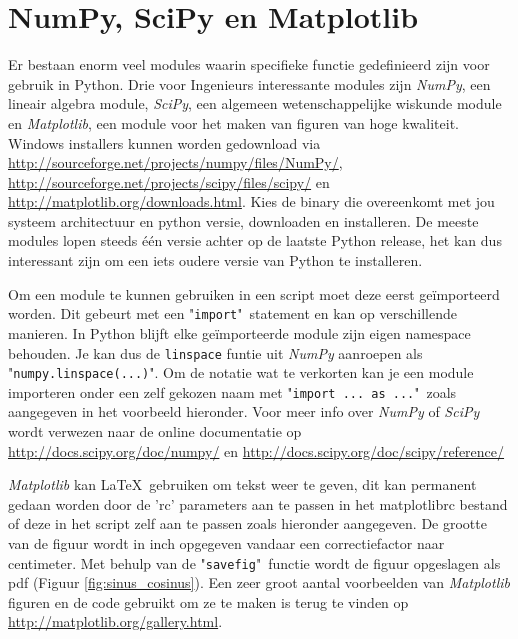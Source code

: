 \documentclass[11pt,twoside]{article}
\begin{document}
	\section{NumPy, SciPy en Matplotlib} 
Er bestaan enorm veel modules waarin specifieke functie gedefinieerd zijn voor gebruik in Python. Drie voor Ingenieurs interessante modules zijn \emph{NumPy}, een lineair algebra module, \emph{SciPy}, een algemeen wetenschappelijke wiskunde module en \emph{Matplotlib}, een module voor het maken van figuren van hoge kwaliteit. Windows installers kunnen worden gedownload via \url{http://sourceforge.net/projects/numpy/files/NumPy/}, \url{http://sourceforge.net/projects/scipy/files/scipy/} en \url{http://matplotlib.org/downloads.html}. Kies de binary die overeenkomt met jou systeem architectuur en python versie, downloaden en installeren. De meeste modules lopen steeds één versie achter op de laatste Python release, het kan dus interessant zijn om een iets oudere versie van Python te installeren.

Om een module te kunnen gebruiken in een script moet deze eerst geïmporteerd worden. Dit gebeurt met een "\lstinline{import}"\ statement en kan op verschillende manieren. In Python blijft elke geïmporteerde module zijn eigen namespace behouden. Je kan dus de \lstinline{linspace} funtie uit \emph{NumPy} aanroepen als "\lstinline{numpy.linspace(...)}". Om de notatie wat te verkorten kan je een module importeren onder een zelf gekozen naam met "\lstinline{import ... as ...}"\ zoals aangegeven in het voorbeeld hieronder. Voor meer info over \emph{NumPy} of \emph{SciPy} wordt verwezen naar de online documentatie op \url{http://docs.scipy.org/doc/numpy/} en \url{http://docs.scipy.org/doc/scipy/reference/}

\emph{Matplotlib} kan \LaTeX\ gebruiken om tekst weer te geven, dit kan permanent gedaan worden door de 'rc' parameters aan te passen in het \textsf{matplotlibrc} bestand of deze in het script zelf aan te passen zoals hieronder aangegeven. De grootte van de figuur wordt in inch opgegeven vandaar een correctiefactor naar centimeter. Met behulp van de "\lstinline{savefig}"\ functie wordt de figuur opgeslagen als pdf (Figuur \ref{fig:sinus_cosinus}). Een zeer groot aantal voorbeelden van \emph{Matplotlib} figuren en de code gebruikt om ze te maken is terug te vinden op \url{http://matplotlib.org/gallery.html}.

\end{document}
